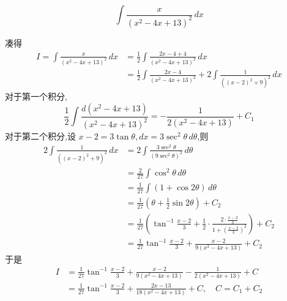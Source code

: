 \begin{questions}
    \question
    \[
    \int \frac{x}{(x^2-4x+13)^2} \,dx
    \]
    \begin{solution}
        凑得
        \begin{align*}
        I= \int \frac{x}{(x^2-4x+13)^2} \,dx
        &= \frac{1}{2} \int \frac{2x-4+4}{(x^2-4x+13)^2} \,dx \\
        &= \frac{1}{2} \int \frac{2x-4}{(x^2-4x+13)^2} + 2 \int \frac{1}{((x-2)^2+9)^2} \,dx 
        \end{align*}
        对于第一个积分,
        \[
        \frac{1}{2} \int \frac{d(x^2-4x+13)}{(x^2-4x+13)^2} = -\frac{1}{2(x^2-4x+13)} + C_1
        \]
        对于第二个积分,设 $x-2 = 3 \tan \theta, dx = 3 \sec^2 \theta \, d\theta$,则
        \begin{align*}
        2 \int \frac{1}{((x-2)^2+9)^2} \,dx 
        &= 2 \int \frac{3 \sec^2 \theta}{(9 \sec^2 \theta)^2} \, d\theta \\
        &= \frac{2}{27} \int \cos^2 \theta \, d\theta \\
        &= \frac{1}{27} \int (1+\cos 2\theta) \, d\theta \\
        &= \frac{1}{27} \left( \theta + \frac{1}{2} \sin 2\theta \right) + C_2 \\
        &= \frac{1}{27} \left( \tan^{-1} \frac{x-2}{3} + \frac{1}{2} \cdot \frac{2 \cdot \frac{x-2}{3}}{1+(\frac{x-2}{3})^2} \right) + C_2 \\
        &= \frac{1}{27} \tan^{-1} \frac{x-2}{3} + \frac{x-2}{9(x^2-4x+13)} + C_2
        \end{align*}
        于是
        \begin{align*}
        I &= \frac{1}{27} \tan^{-1} \frac{x-2}{3} + \frac{x-2}{9(x^2-4x+13)} - \frac{1}{2(x^2-4x+13)} + C \\
        &= \frac{1}{27} \tan^{-1} \frac{x-2}{3} + \frac{2x-13}{18(x^2-4x+13)} + C,\quad C=C_1+C_2
        \end{align*}
    \end{solution}


\end{questions}
